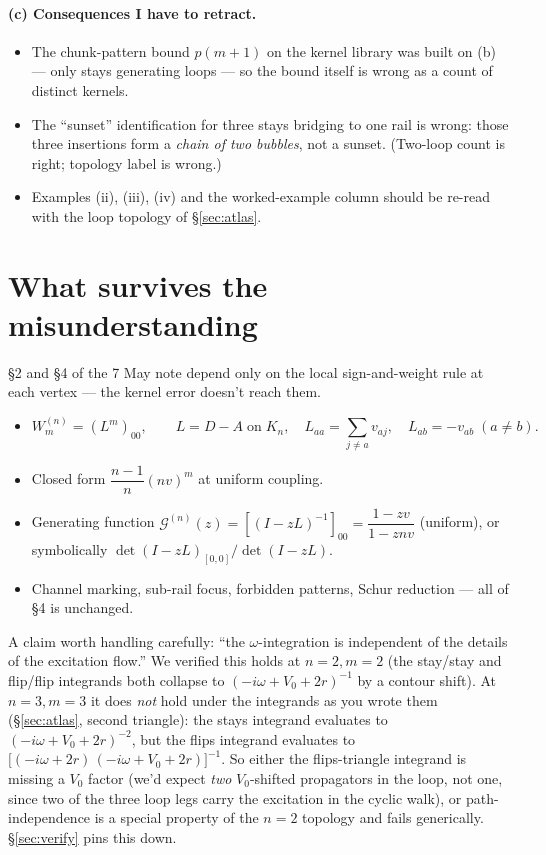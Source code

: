 \documentclass[11pt,a4paper]{article}
\begin{document}
\paragraph{(c) Consequences I have to retract.}
\begin{itemize}[leftmargin=2em,itemsep=2pt]
\item The chunk-pattern bound $p(m{+}1)$ on the kernel library was built
on (b) — only stays generating loops — so the bound itself is wrong as
a count of distinct kernels.
\item The ``sunset'' identification for three stays bridging to one rail
is wrong: those three insertions form a \emph{chain of two bubbles},
not a sunset. (Two-loop count is right; topology label is wrong.)
\item Examples (ii), (iii), (iv) and the worked-example column should be
re-read with the loop topology of \S\ref{sec:atlas}.
\end{itemize}

\section{What survives the misunderstanding}

\S 2 and \S 4 of the 7 May note depend only on the local sign-and-weight
rule at each vertex --- the kernel error doesn't reach them.

\begin{itemize}[leftmargin=2em,itemsep=2pt]
\item \begin{equation}\label{eq:lap}
W^{(n)}_{m}=(L^{m})_{00},\qquad L=D-A\;\text{on}\;K_{n},\quad
L_{aa}=\sum_{j\ne a}v_{aj},\quad L_{ab}=-v_{ab}\;(a\ne b).
\end{equation}
\item Closed form $\dfrac{n-1}{n}(nv)^{m}$ at uniform coupling.
\item Generating function
$\mathcal G^{(n)}(z)=[(I-zL)^{-1}]_{00}=\dfrac{1-zv}{1-znv}$
(uniform), or symbolically
$\det(I-zL)_{[0,0]}/\det(I-zL)$.
\item Channel marking, sub-rail focus, forbidden patterns, Schur
reduction --- all of \S 4 is unchanged.
\end{itemize}

A claim worth handling carefully: ``the $\omega$-integration is
independent of the details of the excitation flow.''  We verified this
holds at $n{=}2,m{=}2$ (the stay/stay and flip/flip integrands both
collapse to $(-i\omega+V_{0}+2r)^{-1}$ by a contour shift). At
$n{=}3,m{=}3$ it does \emph{not} hold under the integrands as you wrote
them (\S\ref{sec:atlas}, second triangle): the stays integrand evaluates
to $(-i\omega+V_{0}+2r)^{-2}$, but the flips integrand evaluates to
$\big[(-i\omega+2r)\,(-i\omega+V_{0}+2r)\big]^{-1}$. So either the
flips-triangle integrand is missing a $V_{0}$ factor (we'd expect
\emph{two} $V_{0}$-shifted propagators in the loop, not one, since two
of the three loop legs carry the excitation in the cyclic walk), or
path-independence is a special property of the $n{=}2$ topology and
fails generically. \S\ref{sec:verify} pins this down.
\end{document}
